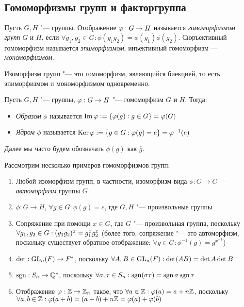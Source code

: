 \subsection{Гомоморфизмы групп и факторгруппа}

\begin{definition}
	Пусть $G, H$ "--- группы. Отображение $\phi : G \hm\to H$ называется \textit{гомоморфизмом групп} $G$ и $H$, если $\forall g_1, g_2 \in G: \phi(g_1g_2) = \phi(g_1)\phi(g_2)$. Сюръективный гомоморфизм называется \textit{эпиморфизмом}, инъективный гомоморфизм --- \textit{мономорфизмом}.
\end{definition}

\begin{note}
	Изоморфизм групп "--- это гомоморфизм, являющийся биекцией, то есть эпиморфизмом и мономорфизмом одновременно.
\end{note}

\begin{definition}
	Пусть $G, H$ "--- группы, $\phi : G \hm\to H$ "--- гомоморфизм $G$ и $H$. Тогда:
	\begin{itemize}
		\item \textit{Образом} $\phi$ называется $\operatorname{Im}\varphi := \{\varphi(g): g \in G\} = \varphi(G)$
		\item \textit{Ядром} $\phi$ называется $\operatorname{Ker}\varphi := \{g \in G: \varphi(g) = e\} = \varphi^{-1}(e)$
	\end{itemize}
\end{definition}

\begin{note}
	Далее мы часто будем обозначать $\phi(g)$ как $\overline{g}$.
\end{note}

\begin{example}
	Рассмотрим несколько примеров гомоморфизмов групп:
	\begin{enumerate}
		\item Любой изоморфизм групп, в частности, изоморфизм вида $\phi: G \to G$ --- \textit{автоморфизм} группы $G$
		\item $\phi: G \to H$, $\forall g \in G: \phi(g) = e$, где $G, H$ "--- произвольные группы
		\item Сопряжение при помощи $x \in G$, где $G$ "--- произвольная группа, поскольку $\forall g_1, g_2 \hm\in G: (g_1g_2)^x = g_1^xg_2^x$ (более того, сопряжение "--- это автоморфизм, поскольку существует обратное отображение: $\forall g \in G: \phi^{-1}(g) = g^{x^{-1}}$)
		\item $\det: \operatorname{GL}_n(F) \to F^*$, поскольку $\forall A, B \in \GL_n(F): \det(AB) \hm= \det A \det B$
		\item $\operatorname{\mathop{sgn}}: S_n \to \mathbb{Q}^*$, поскольку $\forall \sigma, \tau \in S_n: \sgn(\sigma\tau) \hm= \sgn\sigma\sgn\tau$
		\item Отображение $\varphi: \mathbb{Z} \to \mathbb{Z}_n$ такое, что $\forall a \in \mathbb{Z}: \varphi(a) = a + n\mathbb{Z}$, поскольку $\forall a, b \in \Z: \phi(a + b) \hm= (a + b) + n\Z = \phi(a) + \phi(b)$
	\end{enumerate}
\end{example}

